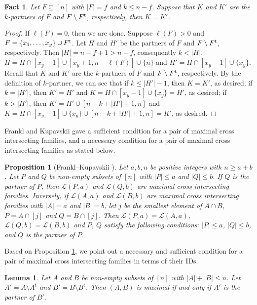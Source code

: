 \documentclass[a4paper,11pt]{article}
\newtheorem{lemma}[theorem]{Lemma}
\newtheorem{fact}[theorem]{Fact}
\newtheorem{proposition}[theorem]{Proposition}
\begin{document}
\begin{fact}\label{fact2.4+}
Let $F\subseteq [n]$ with $|F|=f$ and $k\leq n-f$. Suppose that $K$ and $K'$ are the $k$-partners of $F$ and $F\setminus F^{\rm t}$, respectively, then  $K=K'$.
\end{fact}

\begin{proof}
If $\ell(F)=0$, then we are done. Suppose $\ell(F)>0$ and $F=\{x_1, \dots, x_y\}\cup F^{\rm t}$.
Let $H$ and $H'$ be the partners of $F$ and $F\setminus F^{\rm t}$, respectively. Then $|H|=n-f+1>n-f$, consequently $k<|H|$,
$H=H\cap [x_y-1]\cup [x_y+1, n-\ell(F)]\cup \{n\}$ and
$H'=H\cap [x_y-1]\cup \{x_y\}$.
Recall that  $K$ and $K'$ are the $k$-partners of $F$ and $F\setminus F^{\rm t}$, respectively. By the definition of $k$-partner, we can see that
if $k\leq|H'|-1$,  then $K=K'$, as desired; if $k= |H'|$, then $K'=H'$ and $K=H\cap [x_y-1]\cup \{x_y\}=H'$, as desired; if $k>|H'|$, then $K'=H'\cup [n-k+|H'|+1, n]$ and $K=H\cap [x_y-1]\cup \{x_y\}\cup [n-k+|H'|+1, n]=K'$, as desired.
\end{proof}


Frankl and Kupavskii \cite{FK2018} gave a sufficient condition for a pair of maximal cross  intersecting families, and a necessary condition for a pair of maximal cross  intersecting families as stated below.
\begin{proposition}[Frankl--Kupavskii \cite{FK2018}]\label{FK+}
Let $a, b, n$ be positive integers with $n\geq a+b$. Let $P$ and $Q$ be non-empty subsets of $[n]$ with $|P|\leq a$ and $|Q|\leq b$. If $Q$ is the partner of $P$, then $\mathcal{L}(P, a)$ and $\mathcal{L}(Q, b)$ are maximal cross intersecting families.
Inversely, if $\mathcal{L}(A, a)$ and $\mathcal{L}(B, b)$ are maximal cross intersecting families with $|A|=a$ and $|B|=b$, let $j$ be the smallest element of $A\cap B$, $P=A\cap [j]$ and $Q=B\cap [j]$. Then $\mathcal{L}(P, a)=\mathcal{L}(A, a)$, $\mathcal{L}(Q, b)=\mathcal{L}(B, b)$ and $P$, $Q$ satisfy the following conditions:  $|P|\leq a$, $|Q|\leq b$, and $Q$ is the partner of $P$.
\end{proposition}

Based on Proposition \ref{FK+}, we point out a necessary and sufficient condition for a pair of maximal cross intersecting families in terms of their IDs.

\begin{lemma}\label{fact2.5}
Let $A$ and $B$ be non-empty subsets of $[n]$ with $|A|+|B|\leq n$. Let $A'=A\setminus A^{\mathrm{t}}$ and $B'=B\setminus B^{\mathrm{t}}$. Then $(A, B)$ is maximal if and only if $A'$ is the partner of $B'$.
\end{lemma}
\end{document}
